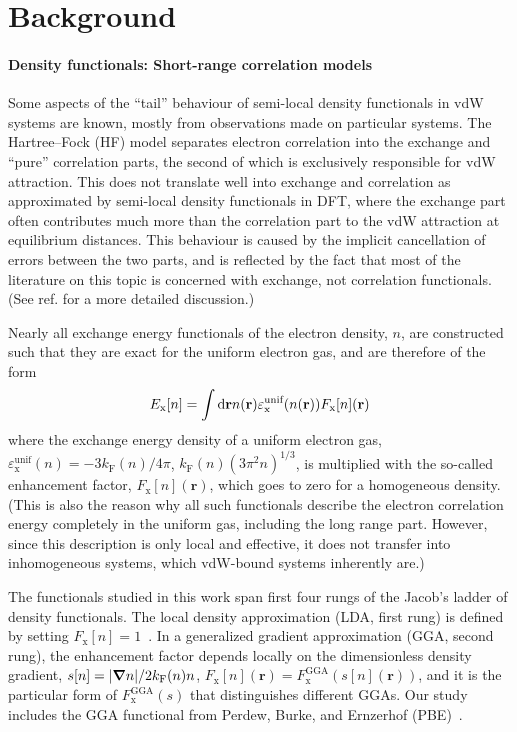 \section{Background}

\paragraph{Density functionals: Short-range correlation models}

Some aspects of the ``tail'' behaviour of semi-local density functionals in vdW systems are known, mostly from observations made on particular systems.
The Hartree--Fock (HF) model separates electron correlation into the exchange and ``pure'' correlation parts, the second of which is exclusively responsible for vdW attraction.
This does not translate well into exchange and correlation as approximated by semi-local density functionals in DFT, where the exchange part often contributes much more than the correlation part to the vdW attraction at equilibrium distances.
This behaviour is caused by the implicit cancellation of errors between the two parts, and is reflected by the fact that most of the literature on this topic is concerned with exchange, not correlation functionals.
(See \mbox{ref.\!} for a more detailed discussion.)

Nearly all exchange energy functionals of the electron density, $n$, are constructed such that they are exact for the uniform electron gas, and are therefore of the form
\begin{equation}
  E_\mathrm x[n]=\int\mathrm d\mathbf rn(\mathbf r)\varepsilon^\text{unif}_\text x(n(\mathbf r))F_\mathrm x[n](\mathbf r)
  \label{eq:exchange-form}
\end{equation}
where the exchange energy density of a uniform electron gas, $\varepsilon^\text{unif}_\mathrm x(n)=-3k_\mathrm F(n)/4\pi$, $k_\mathrm F(n)(3\pi^2n)^{1/3}$, is multiplied with the so-called enhancement factor, $F_\mathrm x[n](\mathbf r)$, which goes to zero for a homogeneous density.
(This is also the reason why all such functionals describe the electron correlation energy completely in the uniform gas, including the long range part.
However, since this description is only local and effective, it does not transfer into inhomogeneous systems, which vdW-bound systems inherently are.)

The functionals studied in this work span first four rungs of the Jacob's ladder of density functionals.
The local density approximation (LDA, first rung) is defined by setting $F_\mathrm x[n]=1$~\cite{DiracMPCPS30}.
In a generalized gradient approximation (GGA, second rung), the enhancement factor depends locally on the dimensionless density gradient, $s[n]=\lvert\boldsymbol\nabla n\rvert/2k_\text F(n)n$, $F_\mathrm x[n](\mathbf r)=F^\text{GGA}_\mathrm x(s[n](\mathbf r))$, and it is the particular form of $F^\text{GGA}_\mathrm x(s)$ that distinguishes different GGAs.
Our study includes the GGA functional from Perdew, Burke, and Ernzerhof (PBE)~\cite{PerdewPRL96}.

